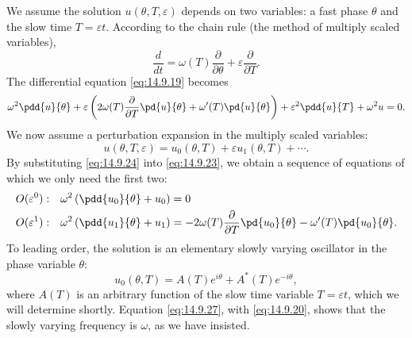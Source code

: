 We assume the solution $u(\theta, T, \varepsilon)$ depends on two variables: a fast phase $\theta$ and the slow time $T = \varepsilon t$. According to the chain rule (the method of multiply scaled variables),
\begin{equation}
\boxed{\frac{d}{d t} = \omega(T)\frac{\partial}{\partial \theta} + \varepsilon\frac{\partial}{\partial T}.}
\label{eq:14.9.22}
\end{equation}
The differential equation \eqref{eq:14.9.19} becomes
\begin{equation}
\omega^2\pdd{u}{\theta} + \varepsilon\left(2\omega(T)\frac{\partial}{\partial T}\pd{u}{\theta} + \omega'(T)\pd{u}{\theta}\right) + \varepsilon^2\pdd{u}{T} + \omega^2 u = 0.
\label{eq:14.9.23}
\end{equation}
We now assume a perturbation expansion in the multiply scaled variables:
\begin{equation}
u(\theta, T, \varepsilon) = u_0(\theta, T) + \varepsilon u_1(\theta, T) + \cdots.
\label{eq:14.9.24}
\end{equation}
By substituting \eqref{eq:14.9.24} into \eqref{eq:14.9.23}, we obtain a sequence of equations of which we only need the first two:
\begin{align}
O(\varepsilon^0): \quad &\omega^2\left(\pdd{u_0}{\theta} + u_0\right) = 0 \label{eq:14.9.25} \\
O(\varepsilon^1): \quad &\omega^2\left(\pdd{u_1}{\theta} + u_1\right) = -2\omega(T)\frac{\partial}{\partial T}\pd{u_0}{\theta} - \omega'(T)\pd{u_0}{\theta}. \label{eq:14.9.26}
\end{align}
To leading order, the solution is an elementary slowly varying oscillator in the phase variable $\theta$:
\begin{equation}
\boxed{u_0(\theta, T) = A(T)e^{i\theta} + A^*(T)e^{-i\theta},}
\label{eq:14.9.27}
\end{equation}
where $A(T)$ is an arbitrary function of the slow time variable $T = \varepsilon t$, which we will determine shortly. Equation \eqref{eq:14.9.27}, with \eqref{eq:14.9.20}, shows that the slowly varying frequency is $\omega$, as we have insisted.

